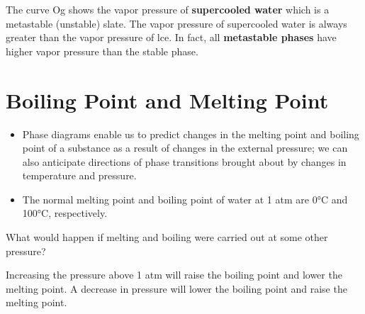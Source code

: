 \documentclass[a4paper,12pt,twocolumn]{article}
\begin{document}
\begin{itemize}
The curve Og shows the vapor pressure of \textbf{supercooled water} which is a metastable (unstable) slate. The vapor pressure of supercooled water is always greater than the vapor pressure of lce.  In fact, all \textbf{metastable phases} have higher vapor pressure than the stable phase. 
\end{itemize}

\section{Boiling Point and Melting Point}
\begin{itemize}
\item Phase diagrams enable us to predict changes in the melting point and boiling point of a substance as a result of changes in the external pressure; we can also anticipate directions of phase transitions brought about by changes in temperature and pressure. 
\item The normal melting point and boiling point of water at 1 atm are 0°C and 100°C, respectively. 
\end{itemize}

\begin{Box1}{}
What would happen if melting and boiling were carried out at some other pressure? 
\end{Box1}
Increasing the pressure above 1 atm will raise the boiling point and lower the melting point. A decrease in pressure will lower the boiling point and raise the melting point.
\end{document}
